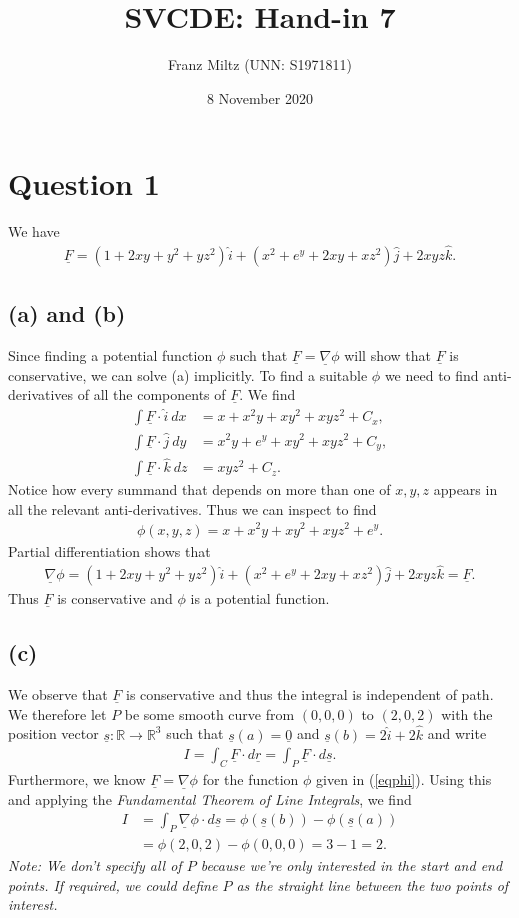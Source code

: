 \documentclass{article}
\newcommand{\R}{\mathbb{R}}
\newcommand{\grad}{\vec\nabla}
\newcommand{\ih}{\widehat i}
\newcommand{\jh}{\widehat j}
\newcommand{\kh}{\widehat k}
\renewcommand{\vec}{\underline}
\begin{document}
\title{SVCDE: Hand-in 7}
\author{Franz Miltz (UNN: S1971811)}
\date{8 November 2020}
\maketitle
\section*{Question 1}
We have 
\begin{align*}
  \vec F = (1+2xy+y^2+yz^2)\ih + (x^2+e^y+2xy+xz^2)\jh + 2xyz\kh.
\end{align*}
\subsection*{(a) and (b)}
Since finding a potential function $\phi$ such that $\vec F = \grad\phi$ 
will show that $\vec F$ is conservative, we can solve (a) implicitly.
To find a suitable $\phi$ we need to find anti-derivatives of all the components
of $\vec F$. We find
\begin{align*}
  \int \vec F\cdot \ih\: dx &= x + x^2y + xy^2 + xyz^2 + C_x,\\
  \int \vec F\cdot \jh\: dy &= x^2y+e^y+xy^2+xyz^2+C_y,\\
  \int \vec F\cdot \kh\: dz &= xyz^2 + C_z.
\end{align*}
Notice how every summand that depends on more than one of $x,y,z$ appears 
in all the relevant anti-derivatives. Thus we can inspect to find
\begin{align}
  \label{eqphi}
  \phi(x,y,z) = x + x^2y + xy^2 + xyz^2 + e^y.
\end{align}
Partial differentiation shows that
\begin{align*}
  \grad \phi = (1+2xy+y^2+yz^2)\ih + (x^2+e^y+2xy+xz^2)\jh + 2xyz\kh = \vec F.
\end{align*}
Thus $\vec F$ is conservative and $\phi$ is a potential function.
\subsection*{(c)}
We observe that $\vec F$ is conservative and thus the integral is independent of
path. We therefore let $P$ be some smooth curve from $(0,0,0)$ to $(2,0,2)$ with the
position vector $\vec s:\R\to\R^3$ such that $\vec s(a)=\vec 0$ and $\vec s(b)=2\ih + 2\kh$
and write
\begin{align*}
  I=\int_C \vec F \cdot d\vec r = \int_P \vec F \cdot d\vec s.
\end{align*}
Furthermore, we know $\vec F=\grad\phi$ for the function $\phi$ given in (\ref{eqphi}).
Using this and applying the \emph{Fundamental Theorem of Line Integrals}, we find
\begin{align*}
  I &= \int_P \grad \phi\cdot d\vec s = \phi(\vec s(b))-\phi(\vec s(a)) \\
  &= \phi(2,0,2)-\phi(0,0,0) = 3 - 1 = 2.
\end{align*}
\emph{Note: We don't specify all of $P$ because we're only interested in the start
and end points. If required, we could define $P$ as the straight line between
the two points of interest.}
\end{document}
